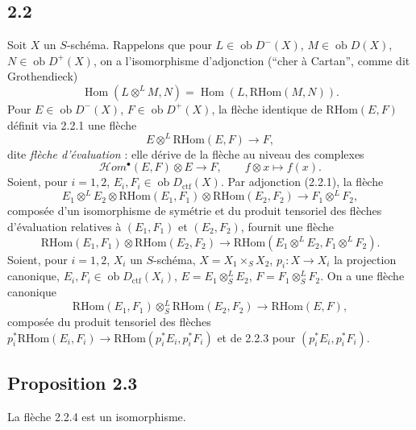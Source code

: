 \documentclass[11pt]{article}
\DeclareMathOperator{\Hom}{Hom}
\newcommand{\ob}{\operatorname{ob}}
\providecommand{\RHom}{\mathrm{RHom}}
\providecommand{\ctf}{\mathrm{ctf}}
\providecommand{\RHom}{\mathrm{RHom}}
\providecommand{\Hom}{\operatorname{Hom}}
\providecommand{\ob}{\operatorname{ob}}
\providecommand{\RHom}{\mathrm R\mathcal{H}om}
\providecommand{\RHom}{\mathrm{RHom}}
\providecommand{\Hom}{\operatorname{Hom}}
\begin{document}
\subsection*{2.2}
Soit $X$ un $S$-schéma. Rappelons que pour $L\in\ob D^{-}(X)$, $M\in\ob D(X)$, $N\in\ob D^{+}(X)$, on a l'isomorphisme d'adjonction (``cher à Cartan'', comme dit Grothendieck)
\begin{equation}\tag{2.2.1}
\Hom(L\otimes^{L}M,N)=\Hom(L,\RHom(M,N)).
\end{equation}
Pour $E\in\ob D^{-}(X)$, $F\in\ob D^{+}(X)$, la flèche identique de $\RHom(E,F)$ définit via 2.2.1 une flèche
\begin{equation}\tag{2.2.2}
E\otimes^{L}\RHom(E,F)\longrightarrow F,
\end{equation}
dite \emph{flèche d'évaluation} : elle dérive de la flèche au niveau des complexes
\[
\mathcal Hom^{\bullet}(E,F)\otimes E\longrightarrow F,
\qquad f\otimes x\longmapsto f(x).
\]
Soient, pour $i=1,2$, $E_i,F_i\in\ob D_{\ctf}(X)$. Par adjonction (2.2.1), la flèche
\[
E_1\otimes^{L}E_2\otimes\RHom(E_1,F_1)\otimes\RHom(E_2,F_2)\longrightarrow F_1\otimes^{L}F_2,
\]
composée d'un isomorphisme de symétrie et du produit tensoriel des flèches d'évaluation relatives à $(E_1,F_1)$ et $(E_2,F_2)$, fournit une flèche
\begin{equation}\tag{2.2.3}
\RHom(E_1,F_1)\otimes\RHom(E_2,F_2)\longrightarrow\RHom(E_1\otimes^{L}E_2,F_1\otimes^{L}F_2).
\end{equation}
Soient, pour $i=1,2$, $X_i$ un $S$-schéma, $X=X_1\times_SX_2$, $p_i:X\to X_i$ la projection canonique, $E_i,F_i\in\ob D_{\ctf}(X_i)$, $E=E_1\otimes^{L}_{S}E_2$, $F=F_1\otimes^{L}_{S}F_2$. On a une flèche canonique
\begin{equation}\tag{2.2.4}
\RHom(E_1,F_1)\otimes^{L}_{S}\RHom(E_2,F_2)\longrightarrow\RHom(E,F),
\end{equation}
composée du produit tensoriel des flèches $p_i^{*}\RHom(E_i,F_i)\to\RHom(p_i^{*}E_i,p_i^{*}F_i)$ et de 2.2.3 pour $(p_i^{*}E_i,p_i^{*}F_i)$.

\subsection*{Proposition 2.3}
La flèche 2.2.4 est un isomorphisme.
\end{document}
